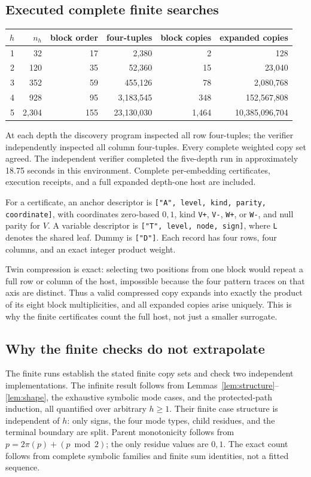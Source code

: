 \documentclass[11pt,a4paper]{article}
\theoremstyle{remark}
\begin{document}
\subsection{Executed complete finite searches}
\begin{center}
\small
\begin{tabular}{r r r r r r}
\toprule
\(h\)&\(n_h\)&block order&four-tuples&block copies&expanded copies\\
\midrule
1&32&17&2,380&2&128\\
2&120&35&52,360&15&23,040\\
3&352&59&455,126&78&2,080,768\\
4&928&95&3,183,545&348&152,567,808\\
5&2,304&155&23,130,030&1,464&10,385,096,704\\
\bottomrule
\end{tabular}
\end{center}
At each depth the discovery program inspected all row four-tuples;
the verifier independently inspected all column four-tuples. Every
complete weighted copy set agreed. The independent verifier completed
the five-depth run in approximately 18.75 seconds in this environment.
Complete per-embedding certificates, execution receipts, and a full
expanded depth-one host are included.

For a certificate, an anchor descriptor is
\texttt{["A", level, kind, parity, coordinate]}, with coordinates
zero-based \(0,1\), kind \texttt{V+}, \texttt{V-}, \texttt{W+}, or
\texttt{W-}, and null parity for \(V\). A variable descriptor is
\texttt{["T", level, node, sign]}, where \texttt{L} denotes the
shared leaf. Dummy is \texttt{["D"]}. Each record has four rows,
four columns, and an exact integer product weight.

Twin compression is exact: selecting two positions from one block
would repeat a full row or column of the host, impossible because
the four pattern traces on that axis are distinct. Thus a valid
compressed copy expands into exactly the product of its eight
block multiplicities, and all expanded copies arise uniquely.
This is why the finite certificates count the full host, not just
a smaller surrogate.

\subsection{Why the finite checks do not extrapolate}
The finite runs establish the stated finite copy sets and check two
independent implementations. The infinite result follows from
Lemmas~\ref{lem:structure}--\ref{lem:shape}, the exhaustive symbolic
mode cases, and the protected-path induction, all quantified over
arbitrary \(h\ge1\). Their finite case structure is independent
of \(h\): only signs, the four mode types, child residues, and the
terminal boundary are split. Parent monotonicity follows from
\(p=2\pi(p)+(p\bmod2)\); the only residue values are \(0,1\).
The exact count follows from complete symbolic families and finite
sum identities, not a fitted sequence.
\end{document}

